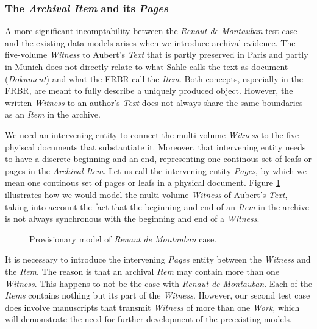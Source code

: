 \subsubsection{The \textit{Archival Item} and its \textit{Pages}}

A more significant incomptability between the \textit{Renaut de Montauban} test case and the existing data models arises when we introduce archival evidence. The five-volume \textit{Witness} to Aubert's \textit{Text} that is partly preserved in Paris and partly in Munich does not directly relate to what Sahle calls the text-as-document (\textit{Dokument}) and what the FRBR call the \textit{Item}. Both concepts, especially in the FRBR, are meant to fully describe a uniquely produced object. However, the written \textit{Witness} to an author's \textit{Text} does not always share the same boundaries as an \textit{Item} in the archive.

We need an intervening entity to connect the multi-volume \textit{Witness} to the five phyiscal documents that substantiate it. Moreover, that intervening entity needs to have a discrete beginning and an end, representing one continous set of leafs or pages in the \textit{Archival Item}. Let us call the intervening entity \textit{Pages}, by which we mean one continous set of pages or leafs in a physical document. Figure \ref{fig:RenautFinal} illustrates how we would model the multi-volume \textit{Witness} of Aubert's \textit{Text}, taking into account the fact that the beginning and end of an \textit{Item} in the archive is not always synchronous with the beginning and end of a \textit{Witness}.

\begin{figure}[ht]
    \begin{center}
    
    \caption{Provisionary model of \textit{Renaut de Montauban} case.}
    \label{fig:RenautFinal}
    \end{center}
\end{figure}

It is necessary to introduce the intervening \textit{Pages} entity between the \textit{Witness} and the \textit{Item}. The reason is that an archival \textit{Item} may contain more than one \textit{Witness}. This happens to not be the case with \textit{Renaut de Montauban}. Each of the \textit{Items} contains nothing but its part of the \textit{Witness}. However, our second test case does involve manuscripts that transmit \textit{Witness} of more than one \textit{Work}, which will demonstrate the need for further development of the preexisting models.

